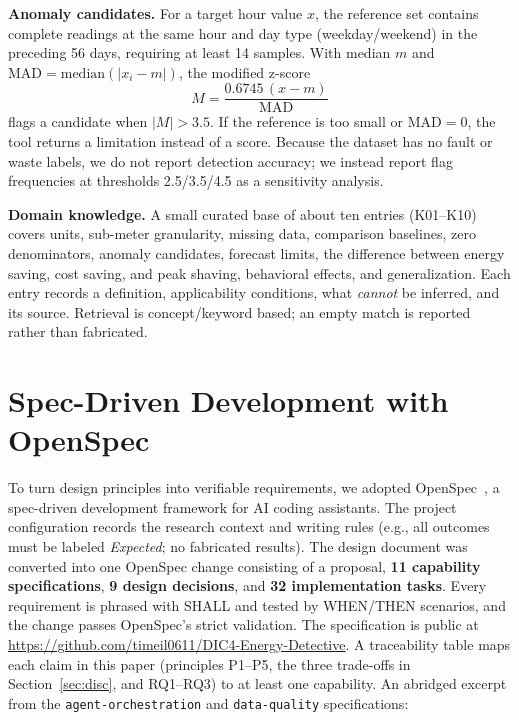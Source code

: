 \documentclass[conference]{IEEEtran}
\begin{document}
\textbf{Anomaly candidates.} For a target hour value $x$, the reference
set contains complete readings at the same hour and day type
(weekday/weekend) in the preceding 56 days, requiring at least 14
samples. With median $m$ and $\mathrm{MAD}=\mathrm{median}(|x_i-m|)$,
the modified z-score~\cite{iglewicz1993outliers,nist_outliers}
\begin{equation}
M = \frac{0.6745\,(x-m)}{\mathrm{MAD}}
\end{equation}
flags a candidate when $|M|>3.5$. If the reference is too small or
$\mathrm{MAD}=0$, the tool returns a limitation instead of a score.
Because the dataset has no fault or waste labels, we do not report
detection accuracy; we instead report flag frequencies at thresholds
2.5/3.5/4.5 as a sensitivity analysis.

\textbf{Domain knowledge.} A small curated base of about ten entries
(K01--K10) covers units, sub-meter granularity, missing data, comparison
baselines, zero denominators, anomaly candidates, forecast limits, the
difference between energy saving, cost saving, and peak shaving,
behavioral effects, and generalization. Each entry records a
definition, applicability conditions, what \emph{cannot} be inferred,
and its source. Retrieval is concept/keyword based; an empty match is
reported rather than fabricated.

\section{Spec-Driven Development with OpenSpec}
\label{sec:openspec}

To turn design principles into verifiable requirements, we adopted
OpenSpec~\cite{openspec}, a spec-driven development framework for AI
coding assistants. The project configuration records the research
context and writing rules (e.g., all outcomes must be labeled
\emph{Expected}; no fabricated results). The design document was
converted into one OpenSpec change consisting of a proposal,
\textbf{11 capability specifications}, \textbf{9 design decisions}, and
\textbf{32 implementation tasks}. Every requirement is phrased with
SHALL and tested by WHEN/THEN scenarios, and the change passes OpenSpec's
strict validation. The specification is public at
\url{https://github.com/timeil0611/DIC4-Energy-Detective}. A traceability table maps each claim in this paper
(principles P1--P5, the three trade-offs in Section~\ref{sec:disc}, and
RQ1--RQ3) to at least one capability. An abridged excerpt from the \texttt{agent-orchestration} and \texttt{data-quality} specifications:
\end{document}
